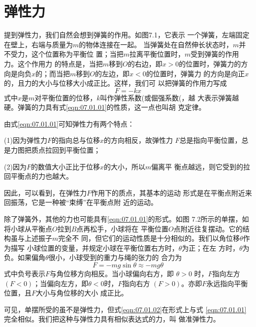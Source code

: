 \section{弹性力}\label{sec:07.01}

提到弹性力，我们自然会想到弹簧的作用。如图7.1，它表示
一个弹簧，左端固定在壁上，右端与质量为$ m $的物体连接在一起。
当弹簧处在自然伸长状态时，$ m $并不受力，这个位置称为平衡位
置；当把$ m $拉离平衡位置时，$ m $受到弹簧的作用力。这个作用力
的特点是，当把$ m $移到$ O $的右边，即$  x > 0   $的位置时，弹簧力的方
向是向负$ x $的；而当把$ m $移到$ O $的左边，即$ x<0 $的位置时，弹簧力
的方向是向正$ x $的，且力的大小与位移大小成正比。这样，我们可
以把弹簧的作用力写成
\begin{equation}\label{eqn:07.01.01}
	F = - k x
\end{equation}
式中$ x $是$ m $对平衡位置的位移，$ k $叫作弹性系数(或倔强系数(，越
大表示弹簧越硬。弹簧的力具有式\eqref{eqn:07.01.01}的性质，这一点也叫胡
克定律。

由式\eqref{eqn:07.01.01}可知弹性力有两个特点：

(1)因为弹性力$ F $的指向总与位移$ x $的方向相反，故弹性力
$ F $总是指向平衡位置，总是力图把质点拉回到平衡位置；

(2)因为$ F $的数值大小正比于位移$ x $的大小，所以$ m $偏离平
衡点越远，则它受到的拉回平衡点的力也越大。

因此，可以看到，在弹性力$ F $作用下的质点，其基本的运动
形式是在平衡点附近来回振荡，它是一种被“束缚”在平衡点附
近的运动。

除了弹簧外，其他的力也可能具有\eqref{eqn:07.01.01}的形式。如图
7.2所示的单摆，如将小球从平衡点$ O $拉到$ B $点再松手，小球将在
平衡位置$ O $点附近往复摆动。它的结构虽与上述振子$ m $完全不
同，但它们的运动性质是十分相似的。我们以角位移$ \theta $作为描写
小球位置的变量，并规定小球在平衡位置右方时，$ \theta $为正；在左
方时，$ \theta $为负。如果偏角$ \theta $很小，小球受到的重力与绳的张力的
合力为
\begin{equation}\label{eqn:07.01.02}
	F = - m g \sin \theta \approx - m g \theta
\end{equation}
式中负号表示$ F $与角位移方向相反。当小球偏向右方，即 $ \theta > 0  $
时，$ F $指向左方$ \left( F < 0 \right) $；当偏向左方，即$  \theta < 0   $时，$ F $指向右方
$ \left( F > 0 \right) $。亦即$ F $永远指向平衡位置，且$ F $大小与角位移的大小
成正比。

可见，单摆所受的虽不是弹性力，但式\eqref{eqn:07.01.02}在形式上与式
\eqref{eqn:07.01.01}完全相似。我们把这种与弹性力具有相似表达式的力，叫
做准弹性力。

